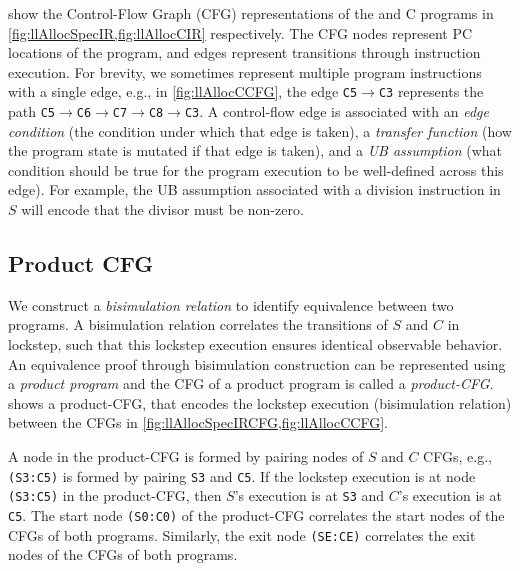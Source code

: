  show the Control-Flow Graph (CFG) representations
of the \SpecL{} and C programs in \cref{fig:llAllocSpecIR,fig:llAllocCIR} respectively.
The CFG nodes represent PC locations of the program, and edges represent
transitions through instruction execution. For brevity, we sometimes represent
multiple program instructions with a single edge, e.g., in \cref{fig:llAllocCCFG}, the edge {\small \tt C5$\rightarrow$C3}
represents the path {\small \tt C5$\rightarrow$C6$\rightarrow$C7$\rightarrow$C8$\rightarrow$C3}. A control-flow edge is associated
with an {\em edge condition} (the condition under which that edge is taken),
a {\em transfer function} (how the program state is mutated if that edge is taken),
and a {\em UB assumption} (what condition should be true for the program
execution to be
well-defined across this edge). For example, the UB assumption associated with a division
instruction in $S$ will encode that the divisor must be non-zero.



\subsection{Product CFG}
\label{sec:productCFG}
We construct
a {\em bisimulation relation} to identify
equivalence between two programs. 
A bisimulation relation correlates
the transitions of $S$ and $C$ in lockstep, such that this
lockstep execution ensures
identical observable behavior.
An equivalence proof through bisimulation construction
can be represented using a
{\em product program} \cite{covac} and the CFG of a product program is called a {\em product-CFG}.
 shows a product-CFG,
that encodes the lockstep execution (bisimulation relation) between the
CFGs in \cref{fig:llAllocSpecIRCFG,fig:llAllocCCFG}.

A node in the product-CFG is formed by pairing nodes
of $S$ and $C$ CFGs, e.g., {\tt (S3:C5)} is formed by
pairing {\tt S3} and {\tt C5}.
If the lockstep
execution is at node {\tt (S3:C5)} in the product-CFG,
then $S$'s execution is at {\tt S3} and $C$'s execution
is at {\tt C5}.
The start node {\tt (S0:C0)} of the product-CFG
correlates the start nodes of the CFGs of both programs.
Similarly, the exit node {\tt (SE:CE)}
correlates the exit nodes of the CFGs of both programs.

